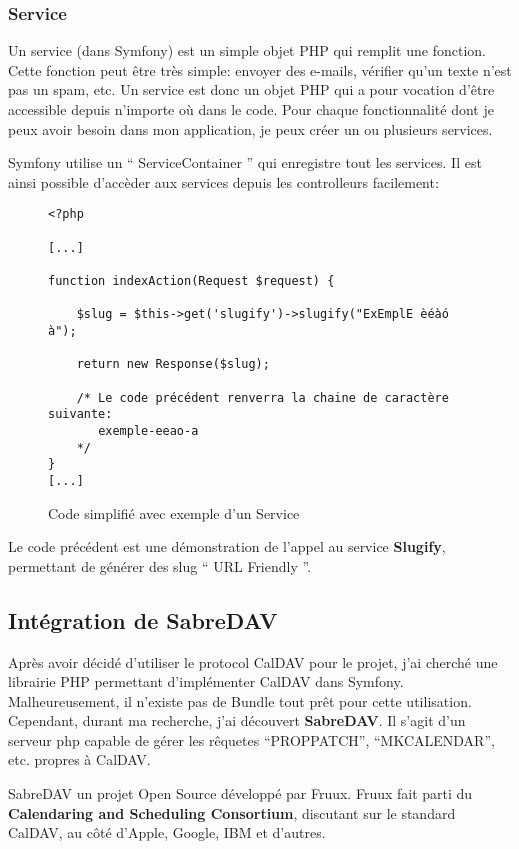 \newpage

\subsubsection*{Service}

Un service (dans Symfony) est un simple objet PHP qui remplit une fonction. Cette fonction peut être très simple: envoyer des e-mails, vérifier qu'un texte n'est pas un spam, etc. Un service est donc un objet PHP qui a pour vocation d'être accessible depuis n'importe où dans le code. Pour chaque fonctionnalité dont je peux avoir besoin dans mon application, je peux créer un ou plusieurs services.

Symfony utilise un `` ServiceContainer '' qui enregistre tout les services. Il est ainsi possible d'accèder aux services depuis les controlleurs facilement:

\begin{figure}[h]
\begin{lstlisting}[frame=single]
<?php

[...]

function indexAction(Request $request) {

    $slug = $this->get('slugify')->slugify("ExEmplE èéàó à");

    return new Response($slug);

    /* Le code précédent renverra la chaine de caractère suivante:
       exemple-eeao-a
    */
}
[...]

\end{lstlisting}
\caption{Code simplifié avec exemple d'un Service}
\end{figure}

Le code précédent est une démonstration de l'appel au service \textbf{Slugify}, permettant de générer des slug `` URL Friendly ''.

\subsection{Intégration de SabreDAV}

Après avoir décidé d'utiliser le protocol CalDAV pour le projet, j'ai cherché une librairie PHP permettant d'implémenter CalDAV dans Symfony. Malheureusement, il n'existe pas de Bundle tout prêt pour cette utilisation. Cependant, durant ma recherche, j'ai découvert \textbf{SabreDAV}. Il s'agit d'un serveur php capable de gérer les rêquetes ``PROPPATCH'', ``MKCALENDAR'', etc. propres à CalDAV.

SabreDAV un projet Open Source développé par Fruux. Fruux fait parti du \textbf{Calendaring and Scheduling Consortium}, discutant sur le standard CalDAV, au côté d'Apple, Google, IBM et d'autres.

